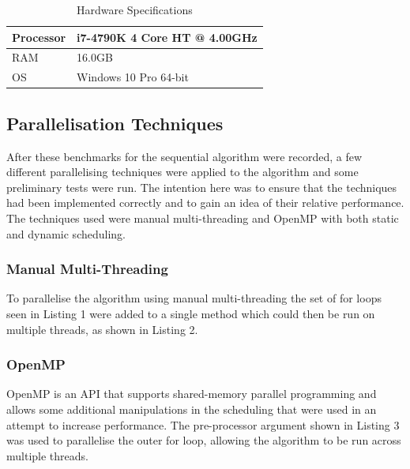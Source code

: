 \documentclass[journal,transmag]{IEEEtran}
\begin{document}
	\begin{table}[!h]
		\renewcommand{\arraystretch}{1.3}
		\caption{Hardware Specifications}
		\label{hardware}
		\centering
		\begin{tabular}{|l|l|}
			\hline
			Processor & i7-4790K 4 Core HT @ 4.00GHz\\ \hline
			RAM & 16.0GB\\ \hline
			OS & Windows 10 Pro 64-bit\\ \hline
		\end{tabular}
	\end{table}
	
	\subsection{Parallelisation Techniques}
	After these benchmarks for the sequential algorithm were recorded, a few different parallelising techniques were applied to the algorithm and some preliminary tests were run. The intention here was to ensure that the techniques had been implemented correctly and to gain an idea of their relative performance. The techniques used were manual multi-threading and OpenMP with both static and dynamic scheduling.\\
	
	
	\subsubsection{Manual Multi-Threading}
	To parallelise the algorithm using manual multi-threading the set of for loops seen in Listing 1 were added to a single method which could then be run on multiple threads, as shown in Listing 2.
	
	
	
	\subsubsection{OpenMP}
	OpenMP is an API that supports shared-memory parallel programming and allows some additional manipulations in the scheduling that were used in an attempt to increase performance. The pre-processor argument shown in Listing 3 was used to parallelise the outer for loop, allowing the algorithm to be run across multiple threads.
	
	
	
\end{document}
